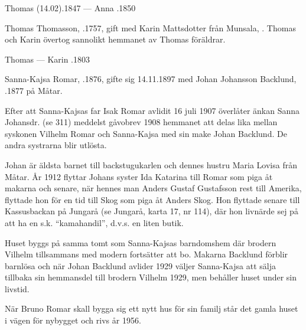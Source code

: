 Thomas (14.02).1847  ---  Anna .1850


%
Thomas Thomasson, .1757, gift med Karin Mattsdotter från Munsala, . Thomas och Karin övertog sannolikt hemmanet av Thomas föräldrar.
\begin{jhchildren}
  \item {}
  \item {}
\end{jhchildren}

Thomas   ---  Karin .1803



%



%
Sanna-Kajsa Romar, .1876, gifte sig 14.11.1897 med Johan Johansson Backlund, .1877 på Måtar.

Efter att Sanna-Kajsas far Isak Romar avlidit 16 juli 1907 överlåter änkan Sanna Johansdr. (se 311) meddelst gåvobrev 1908 hemmanet att delas lika mellan syskonen Vilhelm Romar och Sanna-Kajsa med sin make Johan Backlund. De andra systrarna blir utlösta.

Johan är äldsta barnet till backstugukarlen  och dennes hustru Maria Lovisa från Måtar. År 1912 flyttar Johans syster Ida Katarina till Romar som piga åt makarna och senare, när hennes man Anders Gustaf Gustafsson rest till Amerika, flyttade hon för en tid till Skog som piga åt Anders Skog. Hon flyttade senare till Kassusbackan på Jungarå (se Jungarå, karta 17, nr 114), där hon livnärde sej på att ha en s.k. ``kamahandil'', d.v.s. en liten butik.

Huset byggs på samma tomt som Sanna-Kajsas barndomshem där brodern Vilhelm tillsammans med modern fortsätter att bo. Makarna Backlund förblir barnlösa och när Johan Backlund avlider 1929 väljer Sanna-Kajsa att sälja tillbaka sin hemmansdel till brodern Vilhelm 1929, men behåller huset under sin livstid.

När Bruno Romar skall bygga sig ett nytt hus för sin familj står det gamla huset i vägen för nybygget och rivs år 1956.



